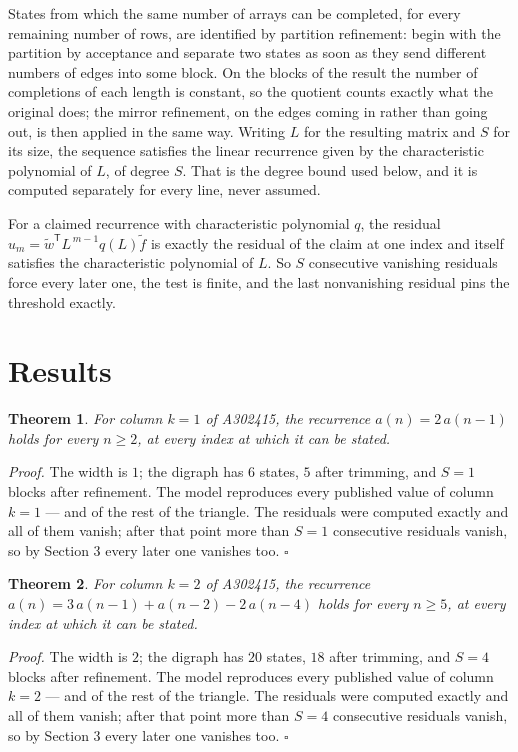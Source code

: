 \documentclass[11pt]{article}
\newtheorem{theorem}{Theorem}
\theoremstyle{definition}
\begin{document}
States from which the same number of arrays can be completed, for every remaining number of rows, are identified by partition refinement: begin with the partition by acceptance and separate two states as soon as they send different numbers of edges into some block. On the blocks of the result the number of completions of each length is constant, so the quotient counts exactly what the original does; the mirror refinement, on the edges coming in rather than going out, is then applied in the same way. Writing $L$ for the resulting matrix and $S$ for its size, the sequence satisfies the linear recurrence given by the characteristic polynomial of $L$, of degree $S$. That is the degree bound used below, and it is computed separately for every line, never assumed.

For a claimed recurrence with characteristic polynomial $q$, the residual $u_m = \tilde w^{\mathsf T}L^{\,m-1}q(L)\tilde f$ is exactly the residual of the claim at one index and itself satisfies the characteristic polynomial of $L$. So $S$ consecutive vanishing residuals force every later one, the test is finite, and the last nonvanishing residual pins the threshold exactly.

\section{Results}

\begin{theorem} For column $k = 1$ of A302415, the recurrence $a(n) = 2\,a(n-1)$ holds for every $n \ge 2$, at every index at which it can be stated.\end{theorem}

{\itshape Proof.} The width is $1$; the digraph has $6$ states, $5$ after trimming, and $S = 1$ blocks after refinement. The model reproduces every published value of column $k = 1$ --- and of the rest of the triangle. The residuals were computed exactly and all of them vanish; after that point more than $S = 1$ consecutive residuals vanish, so by Section 3 every later one vanishes too. $\square$

\begin{theorem} For column $k = 2$ of A302415, the recurrence $a(n) = 3\,a(n-1) + a(n-2) - 2\,a(n-4)$ holds for every $n \ge 5$, at every index at which it can be stated.\end{theorem}

{\itshape Proof.} The width is $2$; the digraph has $20$ states, $18$ after trimming, and $S = 4$ blocks after refinement. The model reproduces every published value of column $k = 2$ --- and of the rest of the triangle. The residuals were computed exactly and all of them vanish; after that point more than $S = 4$ consecutive residuals vanish, so by Section 3 every later one vanishes too. $\square$
\end{document}
